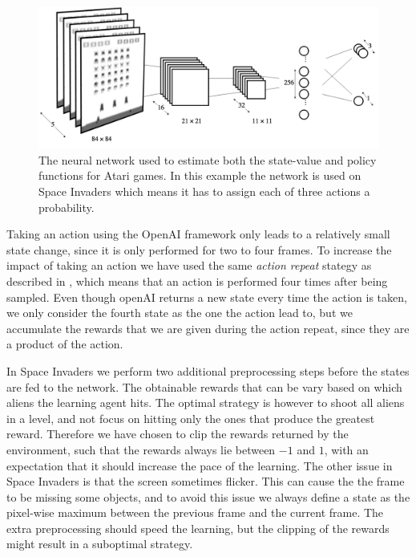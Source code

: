 \documentclass[11pt]{article}
\begin{document}
\begin{figure}[H]
    \centering
    \includegraphics[scale=0.25]{include/Atari_network.png}
    \caption{The neural network used to estimate both the state-value
             and policy functions for Atari games. In this example the network
             is used on Space Invaders which means it has to assign each of three actions a probability.}
    \label{fig:atari_network}
\end{figure}

Taking an action using the OpenAI framework only leads to a relatively small state change,
since it is only performed for two to four frames.
To increase the impact of taking an action we have used the same \textit{action repeat}
stategy as described in \cite{a3c}, which means that an action is performed four times
after being sampled.
Even though openAI returns a new state every time the action is taken, we only consider
the fourth state as the one the action lead to, but we accumulate the rewards that
we are given during the action repeat, since they are a product of the action.

In Space Invaders we perform two additional preprocessing steps before
the states are fed to the network.
The obtainable rewards that can be vary based on which aliens the learning agent
hits.
The optimal strategy is however to shoot all aliens in a level, and not focus on
hitting only the ones that produce the greatest reward.
Therefore we have chosen to clip the rewards returned by the environment, such that
the rewards always lie between $-1$ and $1$, with an expectation that it should increase
the pace of the learning.
The other issue in Space Invaders is that the screen sometimes flicker.
This can cause the the frame to be missing some objects, and
to avoid this issue we always define a state as the pixel-wise maximum
between the previous frame and the current frame.
The extra preprocessing should speed the learning, but
the clipping of the rewards might result in a suboptimal strategy.
\end{document}
